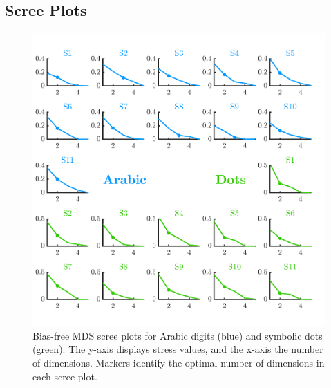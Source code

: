 \subsection{Scree Plots} 
\begin{figure}[tbh]
\centering \includegraphics[scale = .7]{Figures/Appendix/AppD/MDSunbiasScree_1.jpg}
\caption{Bias-free MDS scree plots for Arabic digits (blue) and symbolic dots (green). The y-axis displays stress values, and the x-axis the number of dimensions. Markers identify the optimal number of dimensions in each scree plot.}
\label{fig:Apx_ScreeEngDot}
\end{figure}

